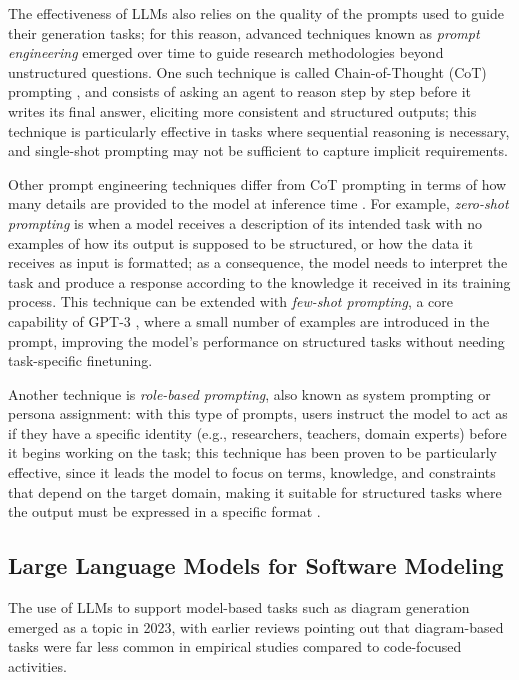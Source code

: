 {{The effectiveness of LLMs also relies on the quality of the prompts used to guide their generation tasks; for this reason, advanced techniques known as \textit{prompt engineering} emerged over time to guide research methodologies beyond unstructured questions. One such technique is called Chain-of-Thought (CoT) prompting \cite{wei2022chain}, and consists of asking an agent to reason step by step before it writes its final answer, eliciting more consistent and structured outputs; this technique is particularly effective in tasks where sequential reasoning is necessary, and single-shot prompting may not be sufficient to capture implicit requirements. 

Other prompt engineering techniques differ from CoT prompting in terms of how many details are provided to the model at inference time \cite{sahoo2024prompting}. For example, \textit{zero-shot prompting} is when a model receives a description of its intended task with no examples of how its output is supposed to be structured, or how the data it receives as input is formatted; as a consequence, the model needs to interpret the task and produce a response according to the knowledge it received in its training process. This technique can be extended with \textit{few-shot prompting}, a core capability of GPT-3 \cite{brown2020language}, where a small number of examples are introduced in the prompt, improving the model's performance on structured tasks without needing task-specific finetuning.

Another technique is \textit{role-based prompting}, also known as system prompting or persona assignment: with this type of prompts, users instruct the model to act as if they have a specific identity (e.g., researchers, teachers, domain experts) before it begins working on the task; this technique has been proven to be particularly effective, since it leads the model to focus on terms, knowledge, and constraints that depend on the target domain, making it suitable for structured tasks where the output must be expressed in a specific format \cite{sahoo2024prompting}.


\subsection{Large Language Models for Software Modeling}

The use of LLMs to support model-based tasks such as diagram generation emerged as a topic in 2023, with earlier reviews \cite{fan2023large, hou2023large} pointing out that diagram-based tasks were far less common in empirical studies compared to code-focused activities. 

}}
